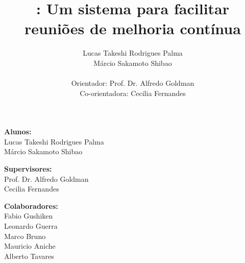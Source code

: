 \documentclass[titlepage, 12pt]{article}
\title{\suricato: Um sistema para facilitar reuniões de melhoria contínua}
\author{Lucas Takeshi Rodrigues Palma\\Márcio Sakamoto Shibao\\ \\Orientador: Prof. Dr. Alfredo Goldman\\Co-orientadora: Cecilia Fernandes}
\begin{document}
	

\maketitle

\tableofcontents
\newpage

\begin{description} 
\item{\textbf{Alunos:}\\Lucas Takeshi Rodrigues Palma\\Márcio Sakamoto Shibao}
\item{\textbf{Supervisores:}\\Prof. Dr. Alfredo Goldman\\Cecilia Fernandes}
\item{\textbf{Colaboradores:}\\Fabio Gushiken\\Leonardo Guerra\\Marco Bruno\\Mauricio Aniche\\Alberto Tavares}
\end{description}


\newpage


\newpage


\newpage


\newpage


\newpage


\newpage

\renewcommand{\appendixname}{Apêndice}
\renewcommand{\appendixpagename}{Apêndices}
\renewcommand{\appendixtocname}{Apêndices}

\appendix
\appendixpage
\addappheadtotoc

\renewcommand\thesection{\Roman{section}}



\newpage


\newpage
\end{document}
